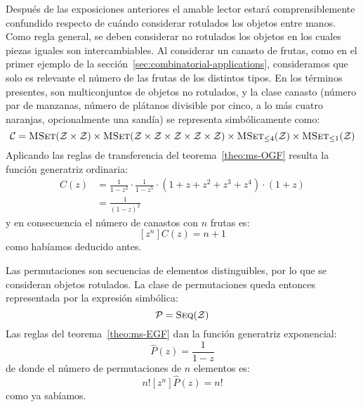   Después de las exposiciones anteriores
  el amable lector estará comprensiblemente confundido
  respecto de cuándo considerar rotulados los objetos entre manos.
  Como regla general,
  se deben considerar no rotulados los objetos
  en los cuales piezas iguales son intercambiables.
  Al considerar un canasto de frutas,
  como en el primer ejemplo
  de la sección~\ref{sec:combinatorial-applications},
  consideramos que solo es relevante el número
  de las frutas de los distintos tipos.
  En los términos presentes,
  son multiconjuntos de objetos no rotulados,
  y la clase canasto
  (número par de manzanas,
   número de plátanos divisible por cinco,
   a lo más cuatro naranjas,
   opcionalmente una sandía)
  se representa simbólicamente como:
  \begin{equation*}
    \mathcal{C}
      = \operatorname{\textsc{MSet}}(\mathcal{Z} \times \mathcal{Z})
	  \times \operatorname{\textsc{MSet}}(\mathcal{Z}
			 \times \mathcal{Z}
			 \times \mathcal{Z}
			 \times \mathcal{Z}
			 \times \mathcal{Z})
	  \times \operatorname{\textsc{MSet}}_{\le 4}(\mathcal{Z})
	  \times \operatorname{\textsc{MSet}}_{\le 1}(\mathcal{Z})
  \end{equation*}
  Aplicando las reglas de transferencia
  del teorema~\ref{theo:ms-OGF}
  resulta la función generatriz ordinaria:
  \begin{align*}
    C(z)
      &= \frac{1}{1 - z^2}
	   \cdot \frac{1}{1 - z^5}
	   \cdot (1 + z + z^2 + z^3 + z^4)
	   \cdot (1 + z) \\
      &= \frac{1}{(1 - z)^2}
  \end{align*}
  y en consecuencia el número de canastos con \(n\) frutas es:
  \begin{equation*}
    \left[ z^n \right] C(z)
      = n + 1
  \end{equation*}
  como habíamos deducido antes.

  Las permutaciones son secuencias de elementos distinguibles,%
  por lo que se consideran objetos rotulados.
  La clase de permutaciones
  queda entonces representada por la expresión simbólica:
  \begin{equation*}
    \mathcal{P}
      = \operatorname{\textsc{Seq}}(\mathcal{Z})
  \end{equation*}
  Las reglas del teorema~\ref{theo:ms-EGF}
  dan la función generatriz exponencial:
  \begin{equation*}
    \widehat{P}(z)
      = \frac{1}{1 - z}
  \end{equation*}
  de donde el número de permutaciones de \(n\) elementos es:
  \begin{equation*}
    n! \left[ z^n \right] \widehat{P}(z)
      = n!
  \end{equation*}
  como ya sabíamos.

